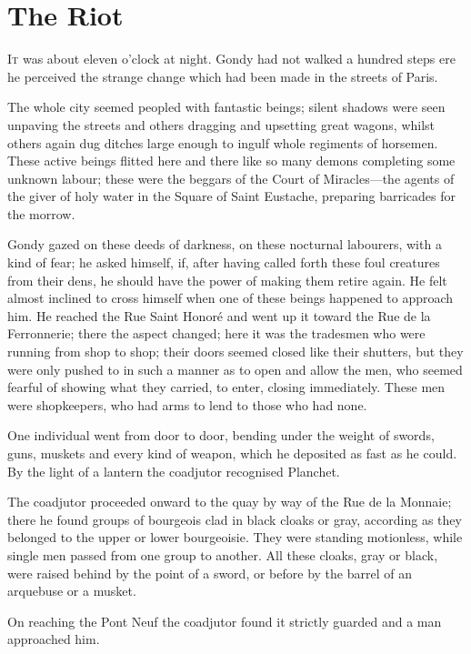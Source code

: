 \chapter{The Riot}

 \lettrine{I}{t} was about eleven o'clock at night. Gondy had not walked a hundred steps ere he perceived the strange change which had been made in the streets of Paris.

\zz
The whole city seemed peopled with fantastic beings; silent shadows were seen unpaving the streets and others dragging and upsetting great wagons, whilst others again dug ditches large enough to ingulf whole regiments of horsemen. These active beings flitted here and there like so many demons completing some unknown labour; these were the beggars of the Court of Miracles—the agents of the giver of holy water in the Square of Saint Eustache, preparing barricades for the morrow.

Gondy gazed on these deeds of darkness, on these nocturnal labourers, with a kind of fear; he asked himself, if, after having called forth these foul creatures from their dens, he should have the power of making them retire again. He felt almost inclined to cross himself when one of these beings happened to approach him. He reached the Rue Saint Honoré and went up it toward the Rue de la Ferronnerie; there the aspect changed; here it was the tradesmen who were running from shop to shop; their doors seemed closed like their shutters, but they were only pushed to in such a manner as to open and allow the men, who seemed fearful of showing what they carried, to enter, closing immediately. These men were shopkeepers, who had arms to lend to those who had none.

One individual went from door to door, bending under the weight of swords, guns, muskets and every kind of weapon, which he deposited as fast as he could. By the light of a lantern the coadjutor recognised Planchet.

The coadjutor proceeded onward to the quay by way of the Rue de la Monnaie; there he found groups of bourgeois clad in black cloaks or gray, according as they belonged to the upper or lower bourgeoisie. They were standing motionless, while single men passed from one group to another. All these cloaks, gray or black, were raised behind by the point of a sword, or before by the barrel of an arquebuse or a musket.

On reaching the Pont Neuf the coadjutor found it strictly guarded and a man approached him.

